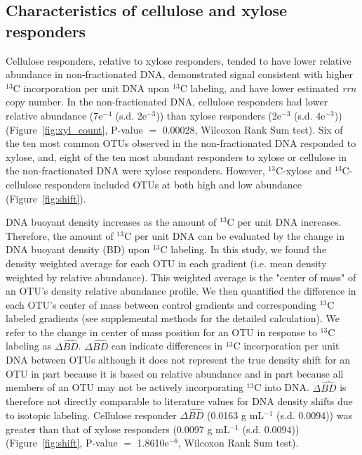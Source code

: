 \subsection{Characteristics of cellulose and xylose responders}
Cellulose responders, relative to xylose responders, tended to have lower
relative abundance in non-fractionated DNA, demonstrated signal consistent
with higher $^{13}$C incorporation per unit DNA upon $^{13}$C labeling, and
have lower estimated \textit{rrn} copy number. In the non-fractionated DNA,
cellulose responders had lower relative abundance (7e$^{-4}$ (s.d. 2e$^{-3}$))
than xylose responders (2e$^{-3}$ (s.d. 4e$^{-3}$))
(Figure~\ref{fig:xyl_count}, P-value $=$ 0.00028, Wilcoxon Rank Sum test). Six
of the ten most common OTUs observed in the non-fractionated DNA responded to
xylose, and, eight of the ten most abundant responders to xylose or cellulose
in the non-fractionated DNA were xylose responders. However, $^{13}$C-xylose
and $^{13}$C-cellulose responders included OTUs at both high and low abundance
(Figure~\ref{fig:shift}).

DNA buoyant density increases as the amount of $^{13}$C per unit DNA increases.
Therefore, the amount of $^{13}$C per unit DNA can be evaluated by the change
in DNA buoyant density (BD) upon $^{13}$C labeling. In this study, we found the
density weighted average for each OTU in each gradient (i.e. mean density
weighted by relative abundance). This weighted average is the "center of mass"
of an OTU's density relative abundance profile. We then quantified the
difference in each OTU's center of mass between control gradients and
corresponding $^{13}$C labeled gradients (see supplemental methods for the
detailed calculation). We refer to the change in center of mass position for an
OTU in response to $^{13}$C labeling as $\Delta\hat{BD}$. $\Delta\hat{BD}$ can
indicate differences in $^{13}$C incorporation per unit DNA between OTUs
although it does not represent the true density shift for an
OTU in part because it is based on relative abundance and in part because all
members of an OTU may not be actively incorporating $^{13}$C into DNA.
$\Delta\hat{BD}$ is therefore not directly comparable to literature values
for DNA density shifts due to isotopic labeling. Cellulose responder
$\Delta\hat{BD}$ (0.0163 g mL$^{-1}$ (s.d. 0.0094)) was greater than that of
xylose responders (0.0097 g mL$^{-1}$ (s.d. 0.0094)) (Figure~\ref{fig:shift},
P-value $=$ 1.8610e$^{-6}$, Wilcoxon Rank Sum test). 

